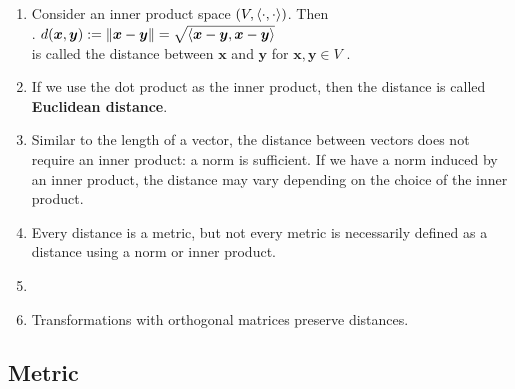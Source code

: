 \begin{enumerate}
    \item Consider an inner product space $(V,\langle\cdot, \cdot\rangle)$. 
    Then
    \hfill \cite{mfml/book/mml/Deisenroth-Faisal-Ong}
    \\
    .\hfill
    $
        d(\bm{x}, \bm{y})
        := \left\| \bm{x} - \bm{y} \right\|
        = \sqrt{\langle\bm{x} - \bm{y}, \bm{x} - \bm{y}\rangle}
    $
    \hfill \cite{mfml/book/mml/Deisenroth-Faisal-Ong}
    \\
    is called the distance between $\bm{x}$ and $\bm{y}$ for $\bm{x}, \bm{y} \in V$ .
    \hfill \cite{mfml/book/mml/Deisenroth-Faisal-Ong}

    \item If we use the dot product as the inner product, then the distance is called \textbf{Euclidean distance}.
    \hfill \cite{mfml/book/mml/Deisenroth-Faisal-Ong}

    \item Similar to the length of a vector, the distance between vectors does not require an inner product: a norm is sufficient.
    If we have a norm induced by an inner product, the distance may vary depending on the choice of the inner product. 
    \hfill \cite{mfml/book/mml/Deisenroth-Faisal-Ong}

    \item Every distance is a metric, but not every metric is necessarily defined as a distance using a norm or inner product.
    \hfill \cite{common/online/chatgpt}

    \item \item Transformations with orthogonal matrices preserve distances.
    \hfill \cite{mfml/book/mml/Deisenroth-Faisal-Ong}
\end{enumerate}




\subsection{Metric}

